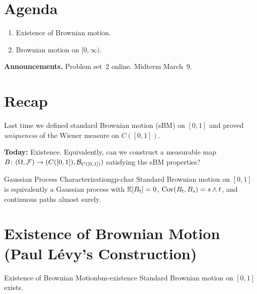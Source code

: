 
\section*{Agenda}
\begin{enumerate}
    \item Existence of Brownian motion.
    \item Brownian motion on $[0,\infty)$.
\end{enumerate}

\noindent\textbf{Announcements.} Problem set~2 online. Midterm March~9.

\section{Recap}

Last time we defined standard Brownian motion (sBM) on $[0,1]$ and proved \emph{uniqueness} of the Wiener measure on $C([0,1])$.

\textbf{Today:} Existence. Equivalently, can we construct a measurable map $B \colon (\Omega, \mathcal{F}) \to (C([0,1]), \mathcal{B}_{C([0,1])})$ satisfying the sBM properties?

\begin{remark}{Gaussian Process Characterization}{gp-char}
    Standard Brownian motion on $[0,1]$ is equivalently a Gaussian process with $\mathbb{E}[B_t] = 0$, $\operatorname{Cov}(B_t, B_s) = s \wedge t$, and continuous paths almost surely.
\end{remark}

\section{Existence of Brownian Motion (Paul L\'{e}vy's Construction)}

\begin{theorem}{Existence of Brownian Motion}{bm-existence}
    Standard Brownian motion on $[0,1]$ exists.
\end{theorem}

